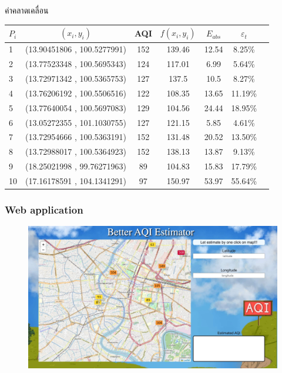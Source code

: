\documentclass[12pt,aspectratio=169]{beamer}
\begin{document}
\begin{frame}{ค่าคลาดเคลื่อน}
        \begin{center}
        \begin{tabular}{lcccccc} 
        \hline
        $P_i$ & $(x_i,y_i)$&AQI & $f(x_i,y_i)$ &  $E_{abs}$ & $\varepsilon_t$\\
        \hline
        1 & (13.90451806 , 100.5277991)   & 152 & 139.46   &12.54 &8.25\% \\
        2 & (13.77523348 , 100.5695343)  &124 & 117.01   &6.99  &5.64\% \\
        3 & (13.72971342 , 100.5365753) &127   & 137.5   &10.5  &8.27\% \\
        4  & (13.76206192 , 100.5506516)  &122  & 108.35   &13.65 &11.19\% \\
        5 & (13.77640054 , 100.5697083) &129 & 104.56   &24.44 &18.95\% \\
        6  & (13.05272355 , 101.1030755) &127  & 121.15   &5.85  &4.61\% \\
        7& (13.72954666 , 100.5363191) &152 & 131.48   &20.52 &13.50\% \\
        8 &  (13.72988017 , 100.5364923) &152 & 138.13   &13.87 &9.13\% \\
        9 & (18.25021998 , 99.76271963) &89 & 104.83   &15.83 &17.79\% \\
        10 & (17.16178591 , 104.1341291) &97 & 150.97   &53.97 &55.64\% \\
        \hline
        \end{tabular}
    \end{center}
\end{frame}

\begin{frame}
    \frametitle{Web application}
        \begin{center}
            \begin{figure}
                \centering
                \includegraphics[width=\textwidth]{img/web-app.jpeg}
            \end{figure}
        \end{center}
    \end{frame}
\end{document}
